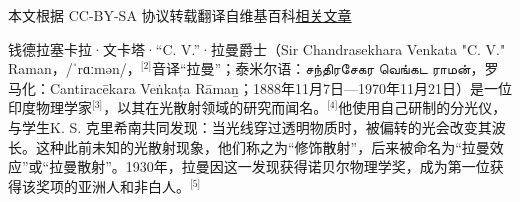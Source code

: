 
本文根据 CC-BY-SA 协议转载翻译自维基百科\href{https://en.wikipedia.org/wiki/C._V._Raman}{相关文章}

钱德拉塞卡拉·文卡塔·“C. V.”·拉曼爵士（Sir Chandrasekhara Venkata "C. V." Raman，/ˈrɑːmən/，\(^\text{[2]}\)音译“拉曼”；泰米尔语：சந்திரசேகர வெங்கட ராமன்，罗马化：Cantiracēkara Veṅkaṭa Rāmaṉ；1888年11月7日—1970年11月21日）是一位印度物理学家\(^\text{[3]}\)，以其在光散射领域的研究而闻名。\(^\text{[4]}\)他使用自己研制的分光仪，与学生K. S. 克里希南共同发现：当光线穿过透明物质时，被偏转的光会改变其波长。这种此前未知的光散射现象，他们称之为“修饰散射”，后来被命名为“拉曼效应”或“拉曼散射”。1930年，拉曼因这一发现获得诺贝尔物理学奖，成为第一位获得该奖项的亚洲人和非白人。\(^\text{[5]}\)
